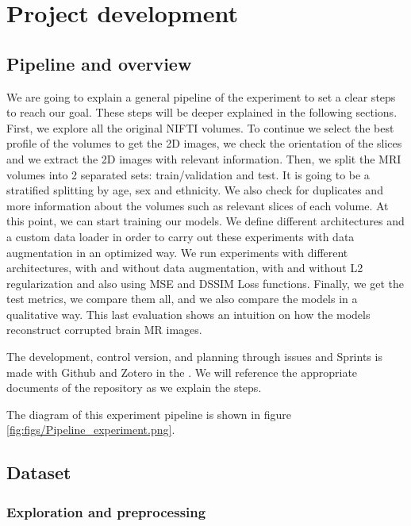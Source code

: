 \chapter{Project development}
\label{chapter:development}

\section{Pipeline and overview}

We are going to explain a general pipeline of the experiment to set a clear steps to reach our goal. These steps will be deeper explained in the following sections. First, we explore all the original NIFTI volumes. To continue we select the best profile of the volumes to get the 2D images, we check the orientation of the slices and we extract the 2D images with relevant information. Then, we split the MRI volumes into 2 separated sets: train/validation and test. It is going to be a stratified splitting by age, sex and ethnicity. We also check for duplicates and more information about the volumes such as relevant slices of each volume. At this point, we can start training our models. We define different architectures and a custom data loader in order to carry out these experiments with data augmentation in an optimized way. We run experiments with different architectures, with and without data augmentation, with and without L2 regularization and also using MSE and DSSIM Loss functions. Finally, we get the test metrics, we compare them all, and we also compare the models in a qualitative way. This last evaluation shows an intuition on how the models reconstruct corrupted brain MR images. 

The development, control version, and planning through issues and Sprints is made with Github and Zotero in the . We will reference the appropriate documents of the repository as we explain the steps.

The diagram of this experiment pipeline is shown in figure \ref{fig:figs/Pipeline_experiment.png}.

\FloatBarrier

\section{Dataset}
\label{section:dataset}

\subsection{Exploration and preprocessing}

